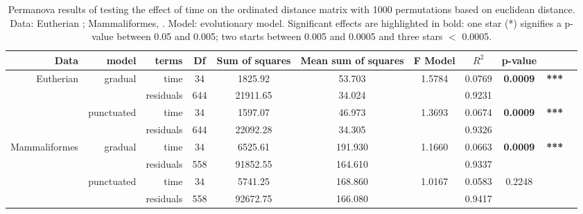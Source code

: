 \documentclass[12pt,letterpaper]{article}
\begin{document}
\begin{landscape}
\begin{table}[ht]
\caption{Permanova results of testing the effect of time on the ordinated distance matrix with 1000 permutations based on euclidean distance. Data: Eutherian \citep[data from][]{beckancient2014}; Mammaliformes, \citep[data from][]{Slater2012MEE}. Model: evolutionary model. Significant effects are highlighted in bold: one star (*) signifies a p-value between 0.05 and 0.005; two starts between 0.005 and 0.0005 and three stars $<$ 0.0005.}
\label{tab:Tab_permanova}
\centering
\begin{tabular}{rrrcccccccc}
  \hline
 Data & model & terms & Df & Sum of squares & Mean sum of squares & F Model & $R^2$ & p-value & \\ 
  \hline
Eutherian     & gradual    & time      & 34  & 1825.92  & 53.703  & 1.5784 & 0.0769 & \textbf{0.0009}& \textbf{***} \\ 
              &            & residuals & 644 & 21911.65 & 34.024  &        & 0.9231 &  &\\ 
              & punctuated & time      & 34  & 1597.07  & 46.973  & 1.3693 & 0.0674 & \textbf{0.0009}& \textbf{***} \\ 
              &            & residuals & 644 & 22092.28 & 34.305  &        & 0.9326 &  &\\ 
Mammaliformes & gradual    & time      & 34  & 6525.61  & 191.930 & 1.1660 & 0.0663 & \textbf{0.0009}& \textbf{***} \\ 
              &            & residuals & 558 & 91852.55 & 164.610 &        & 0.9337 &  &\\ 
              & punctuated & time      & 34  & 5741.25  & 168.860 & 1.0167 & 0.0583 & 0.2248 &\\ 
              &            & residuals & 558 & 92672.75 & 166.080 &        & 0.9417 &  &\\ 
   \hline
\end{tabular}
\end{table}
\end{landscape}
\end{document}
